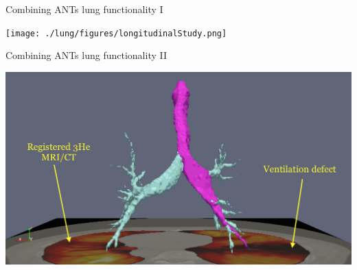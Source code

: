 \documentclass[ignorenonframetext,]{beamer}
\begin{document}
\begin{frame}{Combining ANTs lung functionality I}

\texttt{[image: ./lung/figures/longitudinalStudy.png]}

\end{frame}

\begin{frame}{Combining ANTs lung functionality II}

\includegraphics{./lung/figures/airways.png}

\end{frame}
\end{document}
